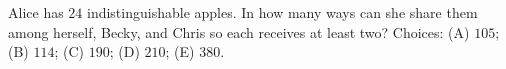 Alice has $24$ indistinguishable apples. In how many ways can she share them among herself, Becky, and Chris so each receives at least two? Choices: (A) $105$; (B) $114$; (C) $190$; (D) $210$; (E) $380$.
